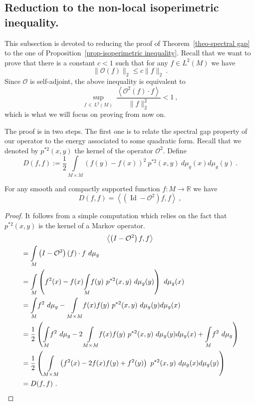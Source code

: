 \documentclass[AHL,Unicode,longabstracts,published]{cedram}
\DeclareMathOperator{\Id}{Id}
\newcommand{\cO}{\mathcal{O}}
\newcommand{\RR}{\mathbb{R}}
\newcommand{\inte}[1]{\underset{#1}{\int}}
\newcommand{\supr}[1]{\underset{#1}{\sup}}
\begin{document}
\subsection{Reduction to the non-local isoperimetric inequality.} \label{subsec-reduction to isop}
This subsection is devoted to reducing the proof of Theorem~\ref{theo-spectral gap} to the one of Proposition~\ref{prop-isoperimetric inequality}. Recall that we want to prove that there is a constant $ c < 1$ such that for any $f \in L^2(M)$ we have
\[
\| \cO(f) \|_2 \le c \|f\|_2 \ .
\]
Since $\cO$ is self-adjoint, the above inequality is equivalent to
\[
\supr{f\,\in\,L^2(M)} \ \frac{\left\langle\cO^2(f) \cdot f \right\rangle}{\| f\|^2_{2}} < 1 \ ,
\]
which is what we will focus on proving from now on.

The proof is in two steps. The first one is to relate the spectral gap property of our operator to the energy associated to some quadratic form. Recall that we denoted by $p^{*2}(x,y)$ the kernel of the operator $\cO^2$. Define
\[
D(f,f):= \frac{1}{2} \inte{M \times M} \left(f(y)-f(x)\right)^2 \ p^{*2}(x,y) \ d \mu_g(x) d \mu_g(y) \ .
\]


\begin{lemm}
For any smooth and compactly supported function $f : M \to \RR$ we have
\begin{equation}\label{eq-demreduction prop isop 1}
D(f,f) = \left\langle \left(\Id- \cO^2\right) f, f\right\rangle \ ,
\end{equation}
\end{lemm}

\begin{proof}
It follows from a simple computation which relies on the fact that $p^{*2}(x,y)$ is the kernel of a Markov operator.
\begin{multline*}
\left\langle \left(I-\cO^2\right) f, f\right\rangle\\
\begin{aligned}
&= \inte{M} \left(I-\cO^2\right)(f) \cdot f \ d \mu_g \\
&= \inte{M} \left(f^2(x)-f(x)\inte{M} f(y) \ p^{*2}(x,y) \ d \mu_g(y) \right) \ d \mu_g(x) \\
&= \inte{M} f^2 \ d \mu_g -\inte{M \times M} f(x)f(y)\ p^{*2}(x,y) \ d \mu_g(y) d \mu_g(x) \\
&= \frac{1}{2} \left(\inte{M} f^2 \ d \mu_g -2 \inte{M \times M} f(x)f(y)\ p^{*2}(x,y) \ d \mu_g(y) d \mu_g(x) + \inte{M} f^2 \ d \mu_g \right)\\
&= \frac{1}{2} \left(\inte{M \times M} \left(f^2(x)-2 f(x)f(y) + f^2(y)\right) \ p^{*2}(x,y) \ d \mu_g(x) d \mu_g(y) \right)\\
&= D(f,f) \ .\qedhere
\end{aligned}
\end{multline*}
\end{proof}
\end{document}
